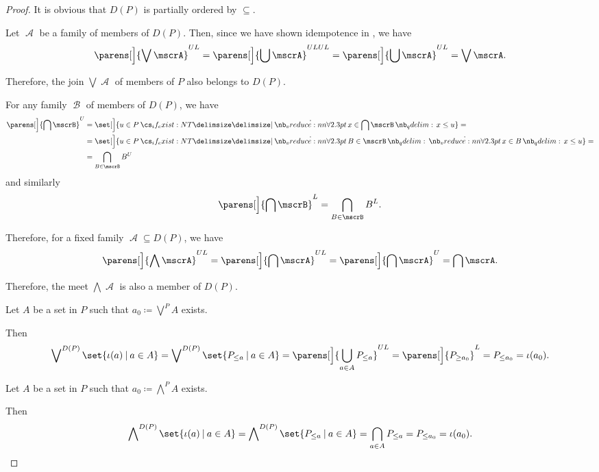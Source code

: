 \begin{proof}
  It is obvious that \( D(P) \) is partially ordered by \( \subseteq \).

   Let \( \mscrA \) be a family of members of \( D(P) \). Then, since we have shown idempotence in , we have
  \begin{equation*}
    \parens[\Big]{ \bigvee \mscrA }^{UL}
    =
    \parens[\Big]{ \bigcup \mscrA }^{ULUL}
    =
    \parens[\Big]{ \bigcup \mscrA }^{UL}
    =
    \bigvee \mscrA.
  \end{equation*}

  Therefore, the join \( \bigvee \mscrA \) of members of \( P \) also belongs to \( D(P) \).

   For any family \( \mscrB \) of members of \( D(P) \), we have
  \begin{align*}
    \parens[\Big]{ \bigcap \mscrB }^U
    &=
    \set[\Big]{ u \in P \given* \qforall {x \in \bigcap \mscrB} x \leq u }
    = \\ &=
    \set[\Big]{ u \in P \given* \qforall {B \in \mscrB} \qforall {x \in B} x \leq u }
    = \\ &=
    \bigcap_{B \in \mscrB} B^U
  \end{align*}
  and similarly
  \begin{equation*}
    \parens[\Big]{ \bigcap \mscrB }^L
    =
    \bigcap_{B \in \mscrB} B^L.
  \end{equation*}

  Therefore, for a fixed family \( \mscrA \subseteq D(P) \), we have
  \begin{equation*}
    \parens[\Big]{ \bigwedge \mscrA }^{UL}
    =
    \parens[\Big]{ \bigcap \mscrA }^{UL}
    =
    \parens[\Big]{ \bigcap \mscrA }^U
    =
    \bigcap \mscrA.
  \end{equation*}

  Therefore, the meet \( \bigwedge \mscrA \) is also a member of \( D(P) \).

   Let \( A \) be a set in \( P \) such that \( a_0 \coloneqq \bigvee^P A \) exists.

  Then
  \begin{equation*}
    \bigvee\nolimits^{D(P)} \set{ \iota(a) \given a \in A }
    =
    \bigvee\nolimits^{D(P)} \set{ P_{\leq a} \given a \in A }
    =
    \parens[\Big]{ \bigcup_{a \in A} P_{\leq a} }^{UL}
    =
    \parens[\Big]{ P_{\geq a_0} }^L
    =
    P_{\leq a_0}
    =
    \iota(a_0).
  \end{equation*}

   Let \( A \) be a set in \( P \) such that \( a_0 \coloneqq \bigwedge^P A \) exists.

  Then
  \begin{equation*}
    \bigwedge\nolimits^{D(P)} \set{ \iota(a) \given a \in A }
    =
    \bigwedge\nolimits^{D(P)} \set{ P_{\leq a} \given a \in A }
    =
    \bigcap_{a \in A} P_{\leq a}
    =
    P_{\leq a_0}
    =
    \iota(a_0).
  \end{equation*}
\end{proof}


